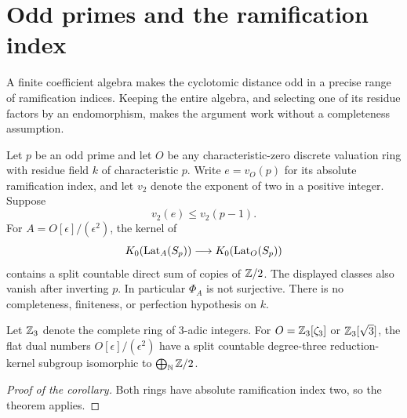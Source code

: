\section{Odd primes and the ramification index}
\label{sec:odd-ramification}

A finite coefficient algebra makes the cyclotomic distance odd in a
precise range of ramification indices.  Keeping the entire algebra,
and selecting one of its residue factors by an endomorphism, makes
the argument work without a completeness assumption.

\begin{theorem}\label{thm:odd-ramification}
Let $p$ be an odd prime and let $O$ be any characteristic-zero discrete
valuation ring with residue field $k$ of characteristic $p$.
Write $e=v_O(p)$ for its absolute ramification index, and let $v_2$
denote the exponent of two in a positive integer.  Suppose
\[
 v_2(e)\le v_2(p-1).
\]
For $A=O[\epsilon]/(\epsilon^2)$, the kernel of
\[
 K_0(\operatorname{Lat}_A(S_p))\longrightarrow K_0(\operatorname{Lat}_O(S_p))
\]
contains a split countable direct sum of copies of $\mathbb Z/2$.
The displayed classes also vanish after inverting $p$.
In particular $\Phi_A$ is not surjective.
There is no completeness, finiteness, or perfection hypothesis on $k$.
\end{theorem}

\begin{corollary}\label{thm:even-ramified-cubic}
Let $\mathbb Z_3$ denote the complete ring of $3$-adic integers.
For $O=\mathbb Z_3[\zeta_3]$ or $\mathbb Z_3[\sqrt3]$, the flat dual numbers
$O[\epsilon]/(\epsilon^2)$ have a split countable degree-three
reduction-kernel subgroup isomorphic to $\bigoplus_{\mathbb N}\mathbb Z/2$.
\end{corollary}

\begin{proof}[Proof of the corollary]
Both rings have absolute ramification index two, so the theorem applies.
\end{proof}

